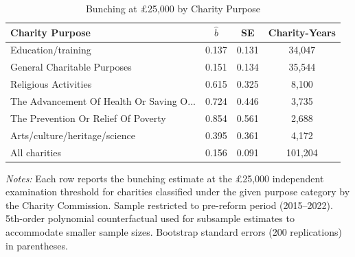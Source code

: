 \begin{table}[htbp]
\centering
\caption{Bunching at \pounds25,000 by Charity Purpose}
\label{tab:heterogeneity}
\begin{tabular}{lccc}
\hline\hline
Charity Purpose & $\hat{b}$ & SE & Charity-Years \\
\hline
Education/training & 0.137 & 0.131 & 34,047 \\
General Charitable Purposes & 0.151 & 0.134 & 35,544 \\
Religious Activities & 0.615 & 0.325 & 8,100 \\
The Advancement Of Health Or Saving O... & 0.724 & 0.446 & 3,735 \\
The Prevention Or Relief Of Poverty & 0.854 & 0.561 & 2,688 \\
Arts/culture/heritage/science & 0.395 & 0.361 & 4,172 \\
\addlinespace
All charities & 0.156 & 0.091 & 101,204 \\
\hline\hline
\end{tabular}
\begin{tablenotes}[flushleft]
\small
\item \textit{Notes:} Each row reports the bunching estimate at the \pounds25,000 independent examination threshold for charities classified under the given purpose category by the Charity Commission. Sample restricted to pre-reform period (2015--2022). 5th-order polynomial counterfactual used for subsample estimates to accommodate smaller sample sizes. Bootstrap standard errors (200 replications) in parentheses.
\end{tablenotes}
\end{table}
